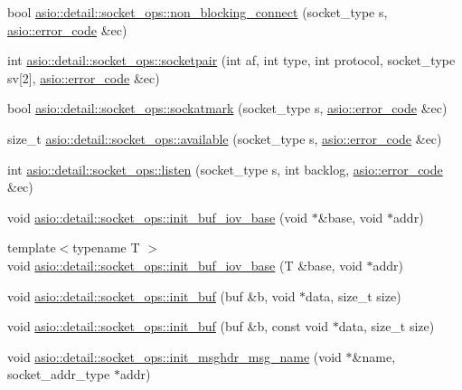 \begin{DoxyCompactItemize}
\item 
bool \hyperlink{namespaceasio_1_1detail_1_1socket__ops_aa06be8dd632b2e6d43727496bcbc614c}{asio\+::detail\+::socket\+\_\+ops\+::non\+\_\+blocking\+\_\+connect} (socket\+\_\+type s, \hyperlink{classasio_1_1error__code}{asio\+::error\+\_\+code} \&ec)
\item 
int \hyperlink{namespaceasio_1_1detail_1_1socket__ops_ada55da61beef75c5958f33c784f6a3c6}{asio\+::detail\+::socket\+\_\+ops\+::socketpair} (int af, int type, int protocol, socket\+\_\+type sv\mbox{[}2\mbox{]}, \hyperlink{classasio_1_1error__code}{asio\+::error\+\_\+code} \&ec)
\item 
bool \hyperlink{namespaceasio_1_1detail_1_1socket__ops_aa09513dd30439b9d31c2a2e1bbbb7f0c}{asio\+::detail\+::socket\+\_\+ops\+::sockatmark} (socket\+\_\+type s, \hyperlink{classasio_1_1error__code}{asio\+::error\+\_\+code} \&ec)
\item 
size\+\_\+t \hyperlink{namespaceasio_1_1detail_1_1socket__ops_a6310acbfccf5ade0364c10c9f2d2b1ce}{asio\+::detail\+::socket\+\_\+ops\+::available} (socket\+\_\+type s, \hyperlink{classasio_1_1error__code}{asio\+::error\+\_\+code} \&ec)
\item 
int \hyperlink{namespaceasio_1_1detail_1_1socket__ops_a2554586ea010408b02fdd2c98e074b13}{asio\+::detail\+::socket\+\_\+ops\+::listen} (socket\+\_\+type s, int backlog, \hyperlink{classasio_1_1error__code}{asio\+::error\+\_\+code} \&ec)
\item 
void \hyperlink{namespaceasio_1_1detail_1_1socket__ops_a2d501279eddfe77032f0fdfd877dfab8}{asio\+::detail\+::socket\+\_\+ops\+::init\+\_\+buf\+\_\+iov\+\_\+base} (void $\ast$\&base, void $\ast$addr)
\item 
{\footnotesize template$<$typename T $>$ }\\void \hyperlink{namespaceasio_1_1detail_1_1socket__ops_a5b51f60f168c89cc2e8c67f35437cdc2}{asio\+::detail\+::socket\+\_\+ops\+::init\+\_\+buf\+\_\+iov\+\_\+base} (T \&base, void $\ast$addr)
\item 
void \hyperlink{namespaceasio_1_1detail_1_1socket__ops_abc10860fe625b4f72fffa1872d82f570}{asio\+::detail\+::socket\+\_\+ops\+::init\+\_\+buf} (buf \&b, void $\ast$data, size\+\_\+t size)
\item 
void \hyperlink{namespaceasio_1_1detail_1_1socket__ops_a614b59d5731876b6af07f8d3ea5e052b}{asio\+::detail\+::socket\+\_\+ops\+::init\+\_\+buf} (buf \&b, const void $\ast$data, size\+\_\+t size)
\item 
void \hyperlink{namespaceasio_1_1detail_1_1socket__ops_ad407b17bbd4f0405e1ec2e1ae5f4752b}{asio\+::detail\+::socket\+\_\+ops\+::init\+\_\+msghdr\+\_\+msg\+\_\+name} (void $\ast$\&name, socket\+\_\+addr\+\_\+type $\ast$addr)

\end{DoxyCompactItemize}
